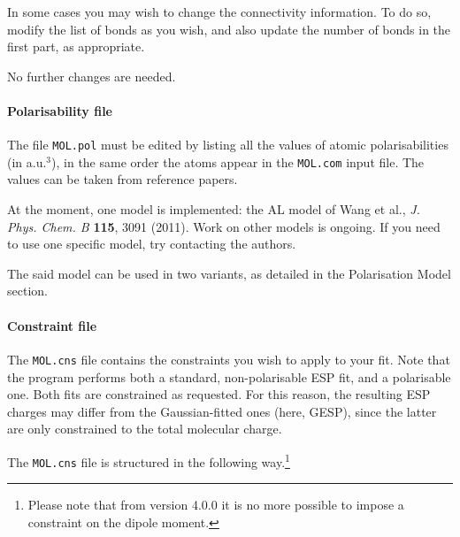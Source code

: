 \documentclass[a4paper]{report}
\begin{document}
In some cases you may wish to change the connectivity information. To do so, modify
the list of bonds as you wish, and also update the number of bonds in the first part,
as appropriate.

No further changes are needed.

\paragraph*{Polarisability file}

The file \texttt{MOL.pol} must be edited by listing all the values of atomic
polarisabilities (in a.u.$^3$), in the same order the atoms appear in the
\texttt{MOL.com} input file. The values can be taken from reference papers.

At the moment, one model is implemented: the AL model of Wang et al., \emph{J.
Phys. Chem. B} \textbf{115}, 3091 (2011). Work on other models is ongoing. If you need to use one specific model, try contacting the authors.

The said model can be used in two variants, as detailed in the Polarisation Model section.

\paragraph*{Constraint file}

The \texttt{MOL.cns} file contains the constraints you wish to apply to your
fit. Note that the program performs both a standard, non-polarisable ESP fit, and a
polarisable one. Both fits are constrained as requested. For this reason, the resulting ESP charges may differ from the Gaussian-fitted ones (here, GESP), since the latter are only constrained to the total molecular charge.

The \texttt{MOL.cns} file is structured in the following way.\footnote{Please note that from version 4.0.0 it is no more possible to impose a constraint on the dipole moment.}
\end{document}
